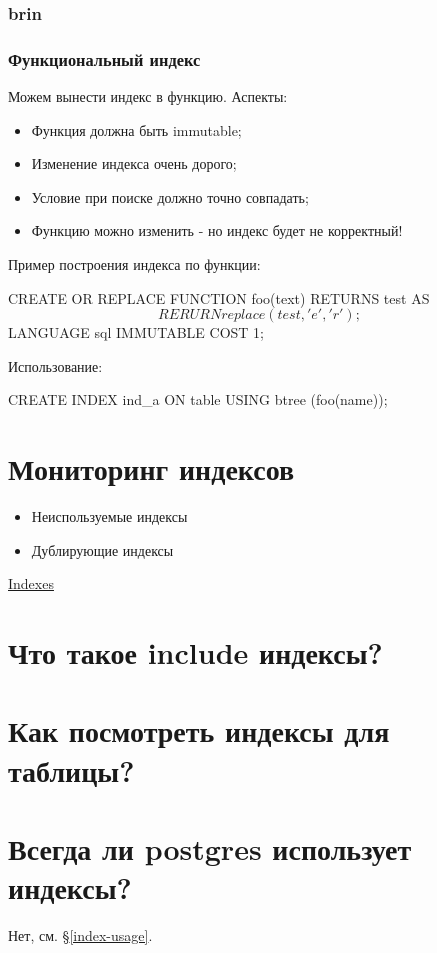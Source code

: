 \subsubsection{brin}

\subsubsection{Функциональный индекс}
Можем вынести индекс в функцию. Аспекты:
\begin{itemize}
\item Функция должна быть immutable;
\item Изменение индекса очень дорого;
\item Условие при поиске должно точно совпадать;
\item Функцию можно изменить - но индекс будет не корректный!
\end{itemize}

Пример построения индекса по функции:
\begin{python}
CREATE OR REPLACE FUNCTION foo(text)
RETURNS test AS $$ RERURN replace(test, 'e', 'r');
$$
LANGUAGE sql IMMUTABLE COST 1;
\end{python}
Использование:
\begin{python}
CREATE INDEX ind_a ON table USING btree (foo(name));
\end{python}

\section{Мониторинг индексов}
\begin{itemize}
\item Неиспользуемые индексы
\item Дублирующие индексы
\end{itemize}

\href{https://wiki.postgresql.org/wiki/Index_Maintenance}{Indexes}

\section{Что такое include индексы?}
\section{Как посмотреть индексы для таблицы?}
\section{Всегда ли postgres использует индексы?}
Нет, см. \S \ref{index-usage}.

